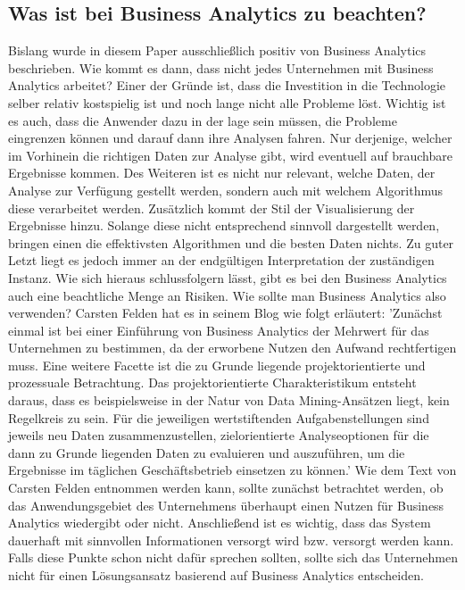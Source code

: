 \documentclass[12pt,twocolumn,twoside]{conference}   %
\begin{document}
\subsection{Was ist bei Business Analytics zu beachten?}
Bislang wurde in diesem Paper ausschließlich positiv von Business Analytics beschrieben. Wie kommt es dann, dass nicht jedes Unternehmen mit Business Analytics arbeitet? Einer der Gründe ist, dass die Investition in die Technologie selber relativ kostspielig ist und noch lange nicht alle Probleme löst. Wichtig ist es auch, dass die Anwender dazu in der lage sein müssen, die Probleme eingrenzen können und darauf dann ihre Analysen fahren. Nur derjenige, welcher im Vorhinein die richtigen Daten zur Analyse gibt, wird eventuell auf brauchbare Ergebnisse kommen. Des Weiteren ist es nicht nur relevant, welche Daten, der Analyse zur Verfügung gestellt werden, sondern auch mit welchem Algorithmus diese verarbeitet werden. Zusätzlich kommt der Stil der Visualisierung der Ergebnisse hinzu. Solange diese nicht entsprechend sinnvoll dargestellt werden, bringen einen die effektivsten Algorithmen und die besten Daten nichts. Zu guter Letzt liegt es jedoch immer an der endgültigen Interpretation der zuständigen Instanz. Wie sich hieraus schlussfolgern lässt, gibt es bei den Business Analytics auch eine beachtliche Menge an Risiken. Wie sollte man Business Analytics also verwenden? Carsten Felden hat es in seinem Blog wie folgt erläutert: 'Zunächst einmal ist bei einer Einführung von Business Analytics der Mehrwert für das Unternehmen zu bestimmen, da der erworbene Nutzen den Aufwand rechtfertigen muss. Eine weitere Facette ist die zu Grunde liegende projektorientierte und prozessuale Betrachtung. Das projektorientierte Charakteristikum entsteht daraus, dass es beispielsweise in der Natur von Data Mining-Ansätzen liegt, kein Regelkreis zu sein. Für die jeweiligen wertstiftenden Aufgabenstellungen sind jeweils neu Daten zusammenzustellen, zielorientierte Analyseoptionen für die dann zu Grunde liegenden Daten zu evaluieren und auszuführen, um die Ergebnisse im täglichen Geschäftsbetrieb einsetzen zu können.' \cite{Beispiel1:2016} Wie dem Text von Carsten Felden entnommen werden kann, sollte zunächst betrachtet werden, ob das Anwendungsgebiet des Unternehmens überhaupt einen Nutzen für Business Analytics wiedergibt oder nicht. Anschließend ist es wichtig, dass das System dauerhaft mit sinnvollen Informationen versorgt wird bzw. versorgt werden kann. Falls diese Punkte schon nicht dafür sprechen sollten, sollte sich das Unternehmen   nicht für einen Lösungsansatz basierend auf Business Analytics entscheiden.
\end{document}
